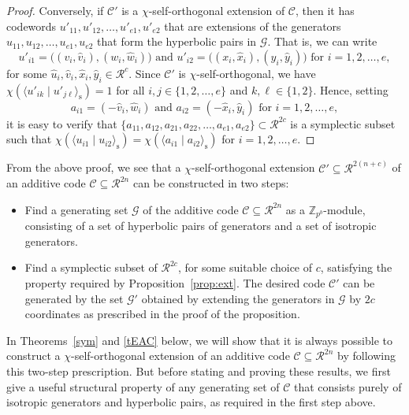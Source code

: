 \documentclass{article}
\theoremstyle{remark}
\theoremstyle{definition}
\numberwithin{equation}{section}
\begin{document}
\begin{proof}
Conversely, if $\mathcal{C}'$ is a $\chi$-self-orthogonal extension of $\mathcal{C}$, then it has codewords $u'_{11},u'_{12},\ldots,u'_{e1},u'_{e2}$ that are extensions of the generators $u_{11},u_{12},\ldots,u_{e1},u_{e2}$ that form the hyperbolic pairs in $\mathcal{G}$. That is, we can write
 $$
 u'_{i1} = \bigl((v_i,\hat{v}_i),(w_i,\hat{w}_i)\bigr) \text{ and }  u'_{i2} = \bigl((x_i,\hat{x}_i),(y_i,\hat{y}_i)\bigr) \text{ for } i = 1,2,\ldots,e,
 $$
for some $\hat{u}_i,\hat{v}_i,\hat{x}_i,\hat{y}_i \in \mathcal{R}^c$. Since $\mathcal{C}'$ is $\chi$-self-orthogonal, we have $\chi(\langle u'_{ik} \mid u'_{j\ell}\rangle_{\text{s}}) = 1$ for all $i,j \in \{1,2,\ldots,e\}$ and $k, \ell \in \{1,2\}$. Hence, setting
$$
a_{i1} = (-\hat{v}_i,\hat{w}_i) \text{ and } a_{i2} = (-\hat{x}_i,\hat{y}_i) \text{ for } i = 1,2,\ldots,e,
$$
it is easy to verify that  $\{a_{11},a_{12},a_{21},a_{22},\ldots,a_{e1},a_{e2}\} \subset \mathcal{R}^{2c}$ is a symplectic subset such that $\chi(\langle u_{i1} \mid u_{i2} \rangle_{\text{s}}) = \chi(\langle a_{i1} \mid a_{i2} \rangle_{\text{s}})$ for $i=1,2,\ldots,e$. 
 \end{proof}

From the above proof, we see that a $\chi$-self-orthogonal extension $\mathcal{C}' \subseteq \mathcal{R}^{2(n+c)}$ of an additive code $\mathcal{C} \subseteq \mathcal{R}^{2n}$ can be constructed in two steps:
\begin{itemize}
\item[(1)] Find a generating set $\mathcal{G}$ of the additive code $\mathcal{C} \subseteq \mathcal{R}^{2n}$ as a $\mathbb{Z}_{p^b}$-module, consisting of a set of hyperbolic pairs of generators and a set of isotropic generators.
\item[(2)] Find a symplectic subset of $\mathcal{R}^{2c}$, for some suitable choice of $c$, satisfying the property required by Proposition~\ref{prop:ext}. The desired code $\mathcal{C}'$ can be generated by the set $\mathcal{G}'$ obtained by extending the generators in $\mathcal{G}$ by $2c$ coordinates as prescribed in the proof of the proposition.
\end{itemize}   

In Theorems~\ref{sym} and \ref{tEAC} below, we will show that it is always possible to construct a $\chi$-self-orthogonal extension of an additive code $\mathcal{C} \subseteq \mathcal{R}^{2n}$ by following this two-step prescription. But before stating and proving these results, we first give a useful structural property of any generating set of $\mathcal{C}$ that consists purely of isotropic generators and hyperbolic pairs, as required in the first step above.
\end{document}
